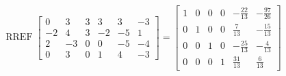 \begin{exerciseAnswer} 


\[\operatorname{RREF} \left[\begin{array}{cccccc}
0 & 3 & 3 & 3 & 3 & -3 \\
-2 & 4 & 3 & -2 & -5 & 1 \\
2 & -3 & 0 & 0 & -5 & -4 \\
0 & 3 & 0 & 1 & 4 & -3
\end{array}\right] = \left[\begin{array}{cccccc}
1 & 0 & 0 & 0 & -\frac{22}{13} & -\frac{97}{26} \\
0 & 1 & 0 & 0 & \frac{7}{13} & -\frac{15}{13} \\
0 & 0 & 1 & 0 & -\frac{25}{13} & -\frac{4}{13} \\
0 & 0 & 0 & 1 & \frac{31}{13} & \frac{6}{13}
\end{array}\right] \]



\end{exerciseAnswer}
